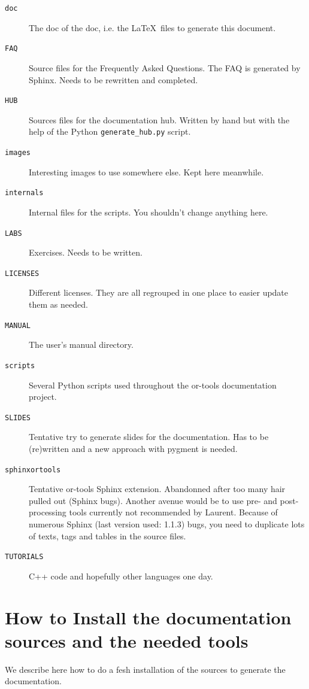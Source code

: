 \documentclass[a4paper,10pt]{article}
\newcommand{\code}[1]{\texttt{#1}}
\begin{document}
\begin{description}
 \item[\code{doc}] The doc of the doc, i.e. the \LaTeX\ files to generate this document.
 \item[\code{FAQ}] Source files for the Frequently Asked Questions. The FAQ is generated by Sphinx. Needs to be rewritten and completed.
 \item[\code{HUB}] Sources files for the documentation hub. Written by hand but with the help of the Python \code{generate\_hub.py} script.
\item[\code{images}] Interesting images to use somewhere else. Kept here meanwhile.
 \item[\code{internals}] Internal files for the scripts. You shouldn't change anything here.
 \item[\code{LABS}] Exercises. Needs to be written.
\item[\code{LICENSES}] Different licenses. They are all regrouped in one place to easier update them as needed.
\item[\code{MANUAL}] The user's manual directory.
\item[\code{scripts}] Several Python scripts used throughout the or-tools documentation project.
\item[\code{SLIDES}] Tentative try to generate slides for the documentation. Has to be (re)written and a new approach with pygment is needed.
\item[\code{sphinxortools}] Tentative or-tools Sphinx extension. Abandonned after too many hair pulled out (Sphinx bugs).
Another avenue would be to use pre- and post-processing tools currently not recommended by Laurent. Because of 
numerous Sphinx (last version used: 1.1.3) bugs, you need to duplicate lots of texts, tags and tables in the source files.
\item[\code{TUTORIALS}] C++ code and hopefully other languages one day.
\end{description}



\section{How to Install the documentation sources and the needed tools}
\label{installation}

We describe here how to do a fesh installation of the sources to generate the documentation.
\end{document}
